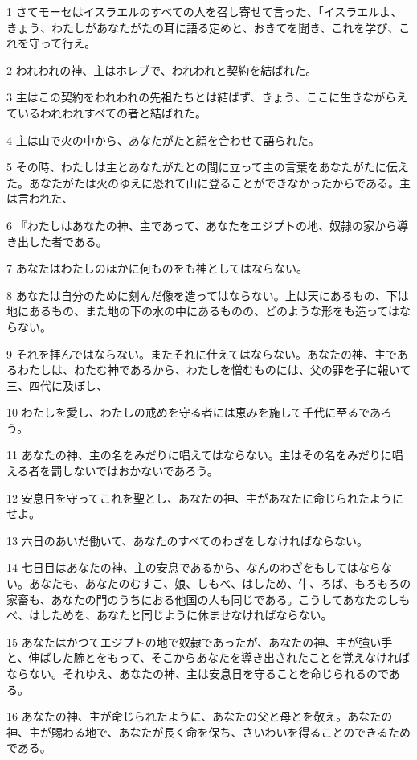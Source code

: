 \par 1 さてモーセはイスラエルのすべての人を召し寄せて言った、「イスラエルよ、きょう、わたしがあなたがたの耳に語る定めと、おきてを聞き、これを学び、これを守って行え。
\par 2 われわれの神、主はホレブで、われわれと契約を結ばれた。
\par 3 主はこの契約をわれわれの先祖たちとは結ばず、きょう、ここに生きながらえているわれわれすべての者と結ばれた。
\par 4 主は山で火の中から、あなたがたと顔を合わせて語られた。
\par 5 その時、わたしは主とあなたがたとの間に立って主の言葉をあなたがたに伝えた。あなたがたは火のゆえに恐れて山に登ることができなかったからである。主は言われた、
\par 6 『わたしはあなたの神、主であって、あなたをエジプトの地、奴隷の家から導き出した者である。
\par 7 あなたはわたしのほかに何ものをも神としてはならない。
\par 8 あなたは自分のために刻んだ像を造ってはならない。上は天にあるもの、下は地にあるもの、また地の下の水の中にあるものの、どのような形をも造ってはならない。
\par 9 それを拝んではならない。またそれに仕えてはならない。あなたの神、主であるわたしは、ねたむ神であるから、わたしを憎むものには、父の罪を子に報いて三、四代に及ぼし、
\par 10 わたしを愛し、わたしの戒めを守る者には恵みを施して千代に至るであろう。
\par 11 あなたの神、主の名をみだりに唱えてはならない。主はその名をみだりに唱える者を罰しないではおかないであろう。
\par 12 安息日を守ってこれを聖とし、あなたの神、主があなたに命じられたようにせよ。
\par 13 六日のあいだ働いて、あなたのすべてのわざをしなければならない。
\par 14 七日目はあなたの神、主の安息であるから、なんのわざをもしてはならない。あなたも、あなたのむすこ、娘、しもべ、はしため、牛、ろば、もろもろの家畜も、あなたの門のうちにおる他国の人も同じである。こうしてあなたのしもべ、はしためを、あなたと同じように休ませなければならない。
\par 15 あなたはかつてエジプトの地で奴隷であったが、あなたの神、主が強い手と、伸ばした腕とをもって、そこからあなたを導き出されたことを覚えなければならない。それゆえ、あなたの神、主は安息日を守ることを命じられるのである。
\par 16 あなたの神、主が命じられたように、あなたの父と母とを敬え。あなたの神、主が賜わる地で、あなたが長く命を保ち、さいわいを得ることのできるためである。
